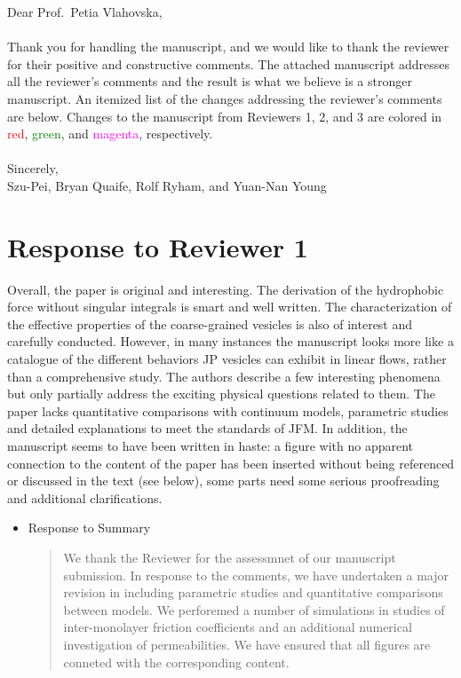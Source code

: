 \documentclass[11pt]{article}
\newcommand{\comment}[1]{{\color{blue} #1}}
\begin{document}
\noindent
Dear Prof.~Petia Vlahovska,
\\ \\
\noindent
Thank you for handling the manuscript, and we would like to thank the
reviewer for their positive and constructive comments. The attached
manuscript addresses all the reviewer's comments and the result is what
we believe is a stronger manuscript. An itemized list of the changes
addressing the reviewer's comments are below. Changes to the manuscript
from Reviewers 1, 2, and 3 are colored in \textcolor{red}{red},
\textcolor{green}{green}, and \textcolor{magenta}{magenta},
respectively. \\ \\
\noindent
Sincerely,
\\
\noindent
Szu-Pei, Bryan Quaife, Rolf Ryham, and Yuan-Nan Young

\section*{Response to Reviewer 1}
\noindent
\comment{Overall, the paper is original and interesting. The derivation
of the hydrophobic force without singular integrals is smart and well
written. The characterization of the effective properties of the
coarse-grained vesicles is also of interest and carefully conducted.
However, in many instances the manuscript looks more like a catalogue of
the different behaviors JP vesicles can exhibit in linear flows, rather
than a comprehensive study. The authors describe a few interesting
phenomena but only partially address the exciting physical questions
related to them. The paper lacks quantitative comparisons with continuum
models, parametric studies and detailed explanations to meet the
standards of JFM. In addition, the manuscript seems to have been written
in haste: a figure with no apparent connection to the content of the
paper has been inserted without being referenced or discussed in the
text (see below), some parts need some serious proofreading and
additional clarifications.}
\begin{itemize}
  \item Response to Summary
  \begin{quotation}
    \noindent
	We thank the Reviewer for the assessmnet of our manuscript submission. In response
to the comments, we have undertaken a major revision in including parametric studies and quantitative comparisons between models. We perforemed a number of simulations 
in studies of inter-monolayer friction coefficients and an additional numerical investigation 
of permeabilities. We have ensured that all figures are conneted with the corresponding content. 

  \end{quotation}
\end{itemize}
\end{document}
